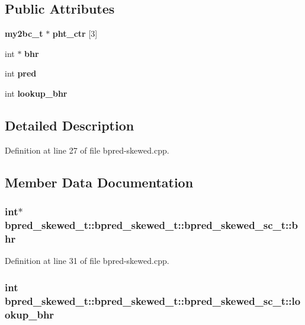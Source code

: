 \subsection*{Public Attributes}
\begin{CompactItemize}
\item 
{\bf my2bc\_\-t} $\ast$ {\bf pht\_\-ctr} [3]
\item 
int $\ast$ {\bf bhr}
\item 
int {\bf pred}
\item 
int {\bf lookup\_\-bhr}
\end{CompactItemize}


\subsection{Detailed Description}


Definition at line 27 of file bpred-skewed.cpp.

\subsection{Member Data Documentation}
\subsubsection[{bhr}]{\setlength{\rightskip}{0pt plus 5cm}int$\ast$ bpred\_\-skewed\_\-t::bpred\_\-skewed\_\-t::bpred\_\-skewed\_\-sc\_\-t::bhr}\label{classbpred__skewed__t_1_1bpred__skewed__sc__t_644acfaf35dd29fd690d801f01654de1}




Definition at line 31 of file bpred-skewed.cpp.
\subsubsection[{lookup\_\-bhr}]{\setlength{\rightskip}{0pt plus 5cm}int bpred\_\-skewed\_\-t::bpred\_\-skewed\_\-t::bpred\_\-skewed\_\-sc\_\-t::lookup\_\-bhr}\label{classbpred__skewed__t_1_1bpred__skewed__sc__t_a0405aa7cf157380bd11b0128a79a883}




